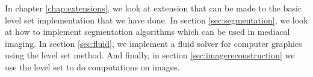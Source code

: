 In chapter \vref{chap:extensions}, we look at extension that can be
made to the basic level set implementation that we have done. In
section \vref{sec:segmentation}, we look at how to implement
segmentation algorithms which can be used in mediacal imaging. In
section \vref{sec:fluid}, we implement a fluid solver for computer
graphics using the level set method. And finally, in section
\vref{sec:imagereconstruction}  we use the level set to do computations
on images.




